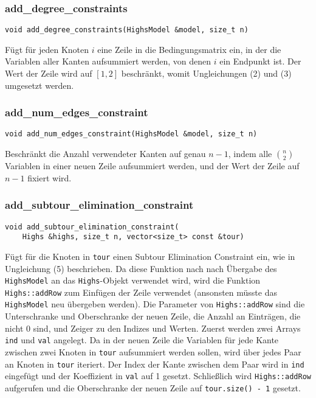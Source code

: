 \documentclass[a4paper, 10pt, ngerman]{article}
\begin{document}
\subsubsection{add\_degree\_constraints}
\verb|void add_degree_constraints(HighsModel &model, size_t n)|
\medskip

\noindent Fügt für jeden Knoten $i$ eine Zeile in die Bedingungsmatrix ein, in der die Variablen aller Kanten aufsummiert werden, von denen $i$ ein Endpunkt ist. Der Wert der Zeile wird auf $[1, 2]$ beschränkt, womit Ungleichungen (2) und (3) umgesetzt werden.

\subsubsection{add\_num\_edges\_constraint}
\verb|void add_num_edges_constraint(HighsModel &model, size_t n)|
\medskip

\noindent Beschränkt die Anzahl verwendeter Kanten auf genau $n - 1$, indem alle $\binom n 2$ Variablen in einer neuen Zeile aufsummiert werden, und der Wert der Zeile auf $n - 1$ fixiert wird.

\subsubsection{add\_subtour\_elimination\_constraint}
\verb|void add_subtour_elimination_constraint(| \\
\verb|    Highs &highs, size_t n, vector<size_t> const &tour)|
\medskip

\noindent Fügt für die Knoten in \verb|tour| einen Subtour Elimination Constraint ein, wie in Ungleichung (5) beschrieben. Da diese Funktion nach nach Übergabe des \verb|HighsModel| an das \verb|Highs|-Objekt verwendet wird, wird die Funktion \verb|Highs::addRow| zum Einfügen der Zeile verwendet (ansonsten müsste das \verb|HighsModel| neu übergeben werden). Die Parameter von \verb|Highs::addRow| sind die Unterschranke und Oberschranke der neuen Zeile, die Anzahl an Einträgen, die nicht 0 sind, und Zeiger zu den Indizes und Werten. Zuerst werden zwei Arrays \verb|ind| und \verb|val| angelegt. Da in der neuen Zeile die Variablen für jede Kante zwischen zwei Knoten in \verb|tour| aufsummiert werden sollen, wird über jedes Paar an Knoten in \verb|tour| iteriert. Der Index der Kante zwischen dem Paar wird in \verb|ind| eingefügt und der Koeffizient in \verb|val| auf 1 gesetzt. Schließlich wird \verb|Highs::addRow| aufgerufen und die Oberschranke der neuen Zeile auf \verb|tour.size() - 1| gesetzt.
\end{document}
